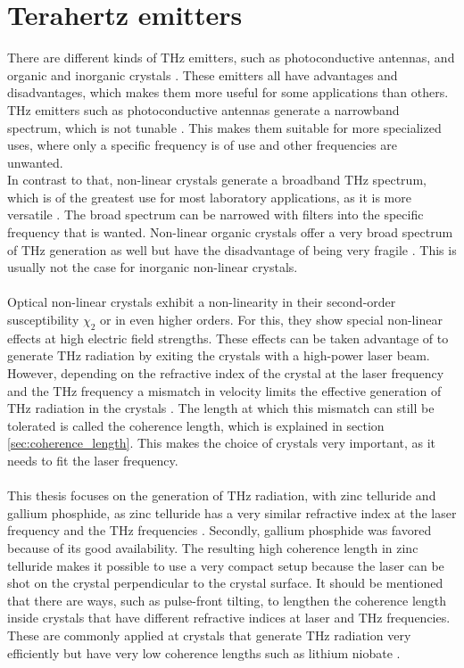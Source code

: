 \section{Terahertz emitters}
\label{sec:emitters}
There are different kinds of $\si{\tera\hertz}$ emitters, such as photoconductive antennas, and organic and inorganic crystals \cite{Tutorial}.
These emitters all have advantages and disadvantages, which makes them more useful for some applications than others.
$\si{\tera\hertz}$ emitters such as photoconductive antennas generate a narrowband spectrum, which is not tunable \cite{PCA_bandwidth}.
This makes them suitable for more specialized uses, where only a specific frequency is of use and other frequencies are unwanted.
\\
In contrast to that, non-linear crystals generate a broadband $\si{\tera\hertz}$ spectrum, which is of the greatest use for most laboratory applications, as it is more versatile \cite{Thz_sources}.
The broad spectrum can be narrowed with filters into the specific frequency that is wanted.
Non-linear organic crystals offer a very broad spectrum of $\si{\tera\hertz}$ generation as well but have the disadvantage of being very fragile \cite{organic_crystals}.
This is usually not the case for inorganic non-linear crystals.
\\\\
Optical non-linear crystals exhibit a non-linearity in their second-order susceptibility $\chi_2$ or in even higher orders.
For this, they show special non-linear effects at high electric field strengths.
These effects can be taken advantage of to generate $\si{\tera\hertz}$ radiation by exiting the crystals with a high-power laser beam.
\\
However, depending on the refractive index of the crystal at the laser frequency and the $\si{\tera\hertz}$ frequency a mismatch in velocity limits the effective generation of $\si{\tera\hertz}$ radiation in the crystals \cite{coherence_legnth}.
The length at which this mismatch can still be tolerated is called the coherence length, which is explained in section \ref{sec:coherence_length}.
This makes the choice of crystals very important, as it needs to fit the laser frequency.
\\\\
This thesis focuses on the generation of $\si{\tera\hertz}$ radiation, with zinc telluride and gallium phosphide, as zinc telluride has a very similar refractive index at the laser frequency and the $\si{\tera\hertz}$ frequencies \cite{coherence_legnth}.
Secondly, gallium phosphide was favored because of its good availability.
The resulting high coherence length in zinc telluride makes it possible to use a very compact setup because the laser can be shot on the crystal perpendicular to the crystal surface.
It should be mentioned that there are ways, such as pulse-front tilting, to lengthen the coherence length inside crystals that have different refractive indices at laser and $\si{\tera\hertz}$ frequencies.
These are commonly applied at crystals that generate $\si{\tera\hertz}$ radiation very efficiently but have very low coherence lengths such as lithium niobate \cite{pulsefront_tilting}.
